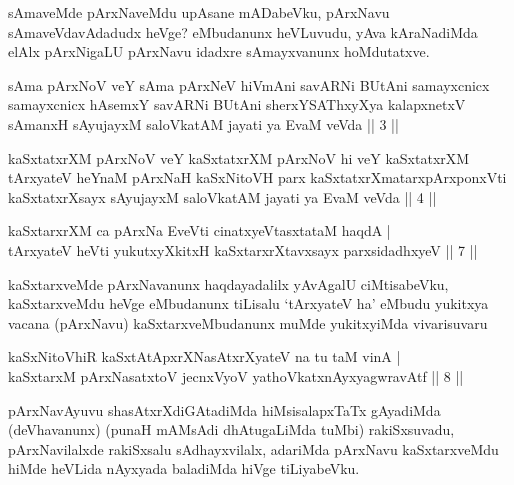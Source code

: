 \begin{artha}
sAmaveMde pArxNaveMdu upAsane mADabeVku, pArxNavu sAmaveVdavAdadudx heVge? eMbudanunx heVLuvudu, yAva kAraNadiMda elAlx pArxNigaLU pArxNavu idadxre sAmayxvanunx hoMdutatxve.
\end{artha}

\begin{kandikeshl}
sAma pArxNoV veY sAma pArxNeV hiVmAni savARNi BUtAni samayxcnicx samayxcnicx hAsemxY savARNi BUtAni sherxYSAThxyXya kalapxnetxV sAmanxH sAyujayxM saloVkatAM jayati ya EvaM veVda || 3 ||
\end{kandikeshl}

\begin{kandikeshl}
kaSxtatxrXM pArxNoV veY kaSxtatxrXM pArxNoV hi veY kaSxtatxrXM tArxyateV heYnaM pArxNaH kaSxNitoVH parx kaSxtatxrXmatarxpArxponxVti kaSxtatxrXsayx sAyujayxM saloVkatAM jayati ya EvaM veVda || 4 ||
\end{kandikeshl}


\begin{shl}
kaSxtarxrXM ca pArxNa EveVti cinatxyeVtasxtataM haqdA | \\
tArxyateV heVti yukutxyXkitxH kaSxtarxrXtavxsayx parxsidadhxyeV \hfill ||  7 || 
\end{shl}

\begin{artha}
kaSxtarxveMde pArxNavanunx haqdayadalilx yAvAgalU ciMtisabeVku, kaSxtarxveMdu heVge eMbudanunx tiLisalu `tArxyateV ha' eMbudu yukitxya vacana (pArxNavu) kaSxtarxveMbudanunx muMde yukitxyiMda vivarisuvaru \mdash 
\end{artha}

\begin{shl}
kaSxNitoVhiR kaSxtAtApxrXNasAtxrXyateV na tu taM vinA | \\
kaSxtarxM pArxNasatxtoV jecnxVyoV yathoVkatxnAyxyagwravAtf \hfill ||  8 || 
\end{shl}

\begin{artha}
pArxNavAyuvu shasAtxrXdiGAtadiMda hiMsisalapxTaTx gAyadiMda (deVhavanunx) (punaH mAMsAdi dhAtugaLiMda tuMbi) rakiSxsuvadu, pArxNavilalxde rakiSxsalu sAdhayxvilalx, adariMda pArxNavu kaSxtarxveMdu hiMde heVLida nAyxyada baladiMda hiVge tiLiyabeVku.
\end{artha}


